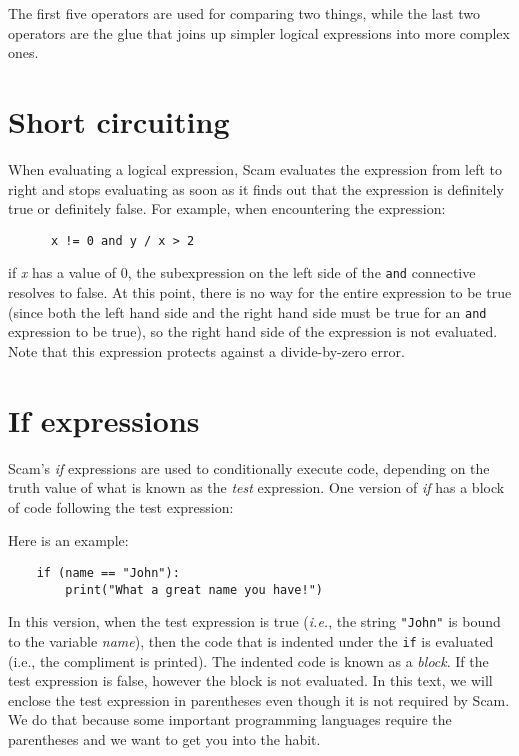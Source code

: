 The first five operators are used for comparing two things,
while the last two operators are the glue that joins up simpler
logical expressions into more complex ones.

\section{Short circuiting}

When evaluating a logical expression,
Scam evaluates the expression from left to right and
stops evaluating as soon as it finds out that the expression
is definitely true or definitely false.
For example, when encountering the expression:

\begin{verbatim}
      x != 0 and y / x > 2
\end{verbatim}

if {\it x} has a value of 0, the subexpression on the left side of the
{\tt and}
connective resolves to false. At this point, there is no way for the
entire expression to be true (since both the left hand side and the right
hand side must be true for an
{\tt and}
expression to be true), so the right
hand side of the expression is not evaluated. Note that this expression
protects against a divide-by-zero error.

\section{If expressions}

Scam's {\it if} expressions are used to conditionally execute code,
depending on the truth value of what is known as the
{\it test} expression. One version of {\it if} has a block of
code following the test expression:

Here is an example:

\begin{verbatim}
    if (name == "John"):
        print("What a great name you have!")
\end{verbatim}

In this version, when the test expression is true ({\it i.e.}, 
the string {\tt "John"} is bound to the variable {\it name}), 
then the code that is indented under the {\tt if} is evaluated 
(i.e., the compliment
is printed). The indented code is known as a {\it block}.
If the test expression is false, however the
block is not evaluated.
In this text, we will enclose the test expression in parentheses
even though it is not required by Scam. We do that because
some important programming languages require the parentheses
and we want to get you into the habit.


